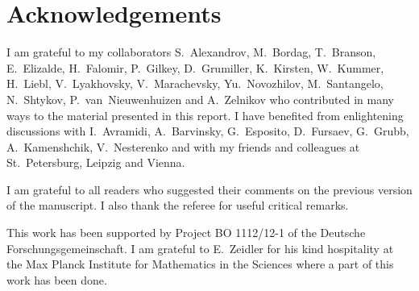 \section*{Acknowledgements}
I am grateful to my collaborators S.~Alexandrov, M.~Bordag,
T.~Branson, E.~Elizalde, H.~Falomir, P.~Gilkey, D.~Grumiller,
K.~Kirsten,
W.~Kummer, H.~Liebl, V.~Lyakhovsky, V.~Marachevsky,
Yu.~Novozhilov, M.~Santangelo, N.~Shtykov, P.~van~Nieuwenhuizen
and A.~Zelnikov who contributed in many ways to the material
presented in this report. I have benefited from enlightening discussions
with I.~Avramidi, A.~Barvinsky, G.~Esposito, D.~Fursaev, G.~Grubb,
A.~Kamenshchik, V.~Nesterenko and 
with my friends and colleagues at St.~Petersburg,
Leipzig and Vienna.

I am grateful to all readers who suggested their comments on the
previous version of the manuscript. I also thank the referee
for useful critical remarks.

This work has been supported by Project BO 1112/12-1 of the
Deutsche Forschungsgemeinschaft. I am grateful to E.~Zeidler
for his kind hospitality at the Max Planck Institute for 
Mathematics in the Sciences where a part of this work has
been done.


